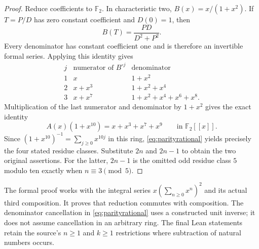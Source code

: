 \documentclass[11pt,a4paper]{article}
\theoremstyle{remark}
\newcommand{\F}{\mathbb F}
\newcommand{\ps}[1]{#1[[x]]}
\begin{document}
\begin{proof}
Reduce coefficients to $\F_2$. In characteristic two,
$B(x)=x/(1+x^2)$. If $T=P/D$ has zero constant coefficient and $D(0)=1$,
then
\[
B(T)=\frac{PD}{D^2+P^2}.
\]
Every denominator has constant coefficient one and is therefore an
invertible formal series. Applying this identity gives
\[
\begin{array}{c|c|c}
j & \text{numerator of }B^{\circ j} & \text{denominator}\\ \hline
1 & x & 1+x^2\\
2 & x+x^3 & 1+x^2+x^4\\
3 & x+x^7 & 1+x^2+x^4+x^6+x^8.
\end{array}
\]
Multiplication of the last numerator and denominator by $1+x^2$ gives
the exact identity
\begin{equation}\label{eq:parityrational}
A(x)(1+x^{10})=x+x^3+x^7+x^9\qquad\text{in }\ps{\F_2}.
\end{equation}
Since $(1+x^{10})^{-1}=\sum_{j\ge0}x^{10j}$ in this ring,
\eqref{eq:parityrational} yields precisely the four stated residue classes.
Substitute $2n$ and $2n-1$ to obtain the two original assertions. For
the latter, $2n-1$ is the omitted odd residue class $5$ modulo ten
exactly when $n\equiv3\pmod5$.
\end{proof}

The formal proof works with the integral series $x(\sum_{n\ge0}x^n)^2$
and its actual third composition. It proves that reduction commutes with
composition. The denominator cancellation in
\eqref{eq:parityrational} uses a constructed unit inverse; it does not
assume cancellation in an arbitrary ring. The final Lean statements
retain the source's $n\ge1$ and $k\ge1$ restrictions where subtraction
of natural numbers occurs.
\end{document}
